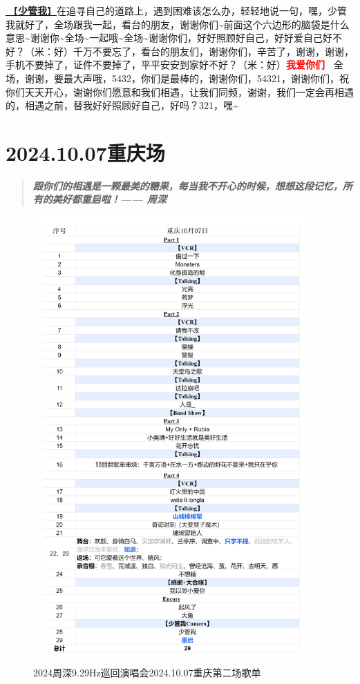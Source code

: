 \documentclass[]{ctexbook}
\begin{document}
\hyperref[watch-ur-manners]{🎵【\textbf{少管我}】}在追寻自己的道路上，遇到困难该怎么办，轻轻地说一句，嘿，少管我就好了，全场跟我一起，看台的朋友，谢谢你们\textasciitilde 前面这个六边形的脑袋是什么意思\textasciitilde 谢谢你\textasciitilde 全场\textasciitilde 一起哦\textasciitilde 全场\textasciitilde 谢谢你们，好好照顾好自己，好好爱自己好不好？（米：好）千万不要忘了，看台的朋友们，谢谢你们，辛苦了，谢谢，谢谢，手机不要掉了，证件不要掉了，平平安安到家好不好？（米：好）\textbf{\textcolor{red}{我爱你们~} } 全场，谢谢，要最大声哦，5432，你们是最棒的，谢谢你们，54321，谢谢你们，祝你们天天开心，谢谢你们愿意和我们相遇，让我们同频，谢谢，我们一定会再相遇的，相遇之前，替我好好照顾好自己，好吗？321，嘿\textasciitilde{}

\chapter{2024.10.07重庆场}\label{chongqing-20241007}

\begin{quote}
\textbf{\emph{跟你们的相遇是一颗最美的糖果，每当我不开心的时候，想想这段记忆，所有的美好都重启啦！------ 周深}}
\end{quote}

\begin{figure}

{\centering \includegraphics[width=300pt]{img/playlists/playlists-chongqing-20241007} 

}

\caption{2024周深9.29Hz巡回演唱会2024.10.07重庆第二场歌单}\label{fig:unnamed-chunk-99}
\end{figure}
\end{document}
